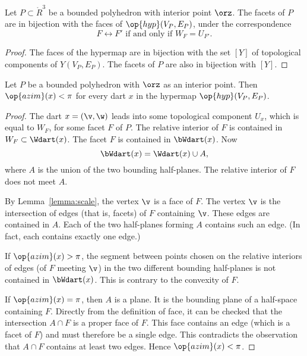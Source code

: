 \begin{lemma}\label{lemma:facet-bi}
Let $P\subset\ring{R}^3$ be a bounded polyhedron with interior point $\orz$.  The
facets of $P$ are in bijection with the faces of $\op{hyp}(V_P,E_P)$, under the
correspondence
$$
F\leftrightarrow F' \text{ if and only if } W_F = U_{F'}.
$$
\end{lemma}

\begin{proof}  The faces of the hypermap are in bijection with the set $[Y]$ of topological components of $Y(V_P,E_P)$.  The facets of $P$ are also in bijection with $[Y]$.
\end{proof}

\begin{lemma} Let $P$ be a bounded polyhedron with $\orz$ as an interior point.  Then $\op{azim}(x) < \pi$  for every dart $x$ in the hypermap $\op{hyp}(V_P,E_P)$.
\end{lemma}
%
%
%
%

\begin{proof}   The dart $x=(\v,\w)$ leads into some topological component $U_x$, which is equal to $W_F$, for some facet $F$ of $P$.  The relative interior of $F$ is contained in $W_F\subset \Wdart(x)$.  The facet $F$ is contained in $\bWdart(x)$. Now
$$
\bWdart(x) = \Wdart(x)\cup A,
$$
where $A$ is the union of the two bounding half-planes.   The relative interior of $F$ does not meet $A$.   

By Lemma~\ref{lemma:scale}, the vertex $\v$ is a face of $F$.  The vertex $\v$ is the intersection of edges (that is, facets) of $F$ containing $\v$.  These edges are contained in $A$.  Each of the two half-planes forming $A$ contains such an edge. (In fact, each contains exactly one edge.)
%
%
%
%
%

If $\op{azim}(x)>\pi$, the segment between points chosen on the relative interiors of edges (of $F$ meeting $\v$) in the two different bounding half-planes is not contained in $\bWdart(x)$.  This is contrary to the convexity of $F$.
%
%

If $\op{azim}(x)=\pi$, then $A$ is a plane.  It is the bounding plane of a half-space containing $F$.  Directly from the definition of face, it can be checked that the intersection $A\cap F$ is a proper face of $F$.  This face contains an edge (which is a facet of $F$) and must therefore be a single edge.  This contradicts the observation that $A\cap F$ contains at least two edges.  Hence $\op{azim}(x)<\pi$.
\end{proof}


